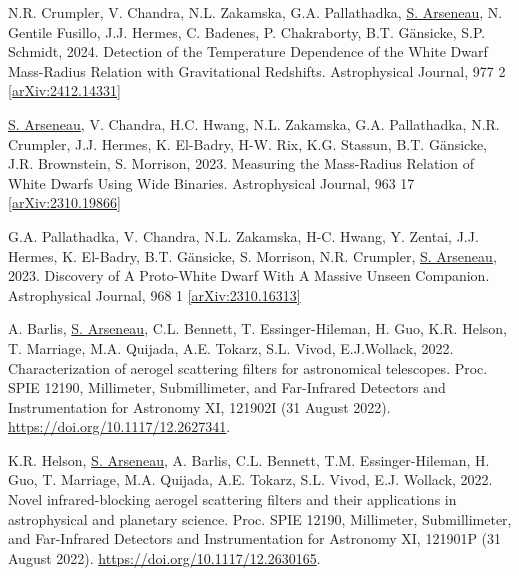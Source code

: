 \documentclass[letterpaper,11pt]{article}
\newenvironment{packed_enumerate}[1][]{
\begin{etaremune}[#1]
  \setlength{\itemsep}{3.7pt}
  \setlength{\parskip}{0pt}
  \setlength{\parsep}{0pt}}{\end{etaremune}
}
\begin{document}
\begin{packed_enumerate}

\item  N.R. Crumpler, V. Chandra, N.L. Zakamska, G.A. Pallathadka, \underline{S. Arseneau}, N. Gentile Fusillo, J.J. Hermes, C. Badenes, P. Chakraborty, B.T. Gänsicke, S.P. Schmidt, 2024. Detection of the Temperature Dependence of the White Dwarf Mass-Radius Relation with Gravitational Redshifts. Astrophysical Journal, 977 2 \href{https://arxiv.org/abs/2412.14331}{[arXiv:2412.14331]} 

\item \underline{S. Arseneau}, V. Chandra, H.C. Hwang, N.L. Zakamska, G.A. Pallathadka, N.R. Crumpler, J.J. Hermes, K. El-Badry, H-W. Rix, K.G. Stassun, B.T. G\"ansicke, J.R. Brownstein, S. Morrison, 2023. Measuring the Mass-Radius Relation of White Dwarfs Using Wide Binaries. Astrophysical Journal, 963 17 \href{https://arxiv.org/abs/2310.19866}{[arXiv:2310.19866]}

\item G.A. Pallathadka, V. Chandra, N.L. Zakamska, H-C. Hwang, Y. Zentai, J.J. Hermes, K. El-Badry, B.T. G\"ansicke, S. Morrison, N.R. Crumpler, \underline{S. Arseneau}, 2023. Discovery of A Proto-White Dwarf With A Massive Unseen Companion. Astrophysical Journal, 968 1 \href{https://doi.org/10.48550/arXiv.2310.16313}{[arXiv:2310.16313]}

\item A. Barlis, \underline{S. Arseneau}, C.L. Bennett, T. Essinger-Hileman, H. Guo, K.R. Helson, T. Marriage, M.A. Quijada, A.E. Tokarz, S.L. Vivod, E.J.Wollack, 2022. Characterization of aerogel scattering filters for astronomical telescopes. Proc. SPIE 12190, Millimeter, Submillimeter, and Far-Infrared Detectors and Instrumentation for Astronomy XI, 121902I (31 August 2022). \href{https://doi.org/10.1117/12.2627341}{https://doi.org/10.1117/12.2627341}.

\item K.R. Helson, \underline{S. Arseneau}, A. Barlis, C.L. Bennett, T.M. Essinger-Hileman, H. Guo, T. Marriage, M.A. Quijada, A.E. Tokarz, S.L. Vivod, E.J. Wollack, 2022. Novel infrared-blocking aerogel scattering filters and their applications in astrophysical and planetary science. Proc. SPIE 12190, Millimeter, Submillimeter, and Far-Infrared Detectors and Instrumentation for Astronomy XI, 121901P (31 August 2022). \href{https://doi.org/10.1117/12.2630165}{https://doi.org/10.1117/12.2630165}.

\end{packed_enumerate}
\vspace{2.0mm}
\end{document}
